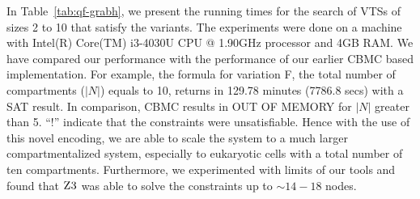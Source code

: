 

In Table~\ref{tab:qf-grabh}, we present the running times for the search of
VTSs of sizes 2 to 10 that satisfy the variants.
%
The experiments were done on a machine with Intel(R) Core(TM) i3-4030U
CPU @ 1.90GHz processor and 4GB RAM.
%
We have compared our performance with the performance of our earlier 
CBMC based implementation.
%
For example, the formula for variation F, the total number of
compartments ($|N|$) equals to 10, returns in 129.78 minutes (7786.8 secs)
with a SAT result.
%
In comparison, CBMC results in OUT OF MEMORY for $|N|$ greater than 5.
%
``!'' indicate that the constraints were unsatisfiable.
%
Hence with the use of this novel encoding, we are able to scale the
system to a much larger compartmentalized system, especially to
eukaryotic cells with a total number of ten compartments.
%
%
Furthermore, we experimented with limits of our tools and found
that $\textsc{Z3}$ was able to solve the constraints up to $\sim{14-18}$ nodes.



% 






